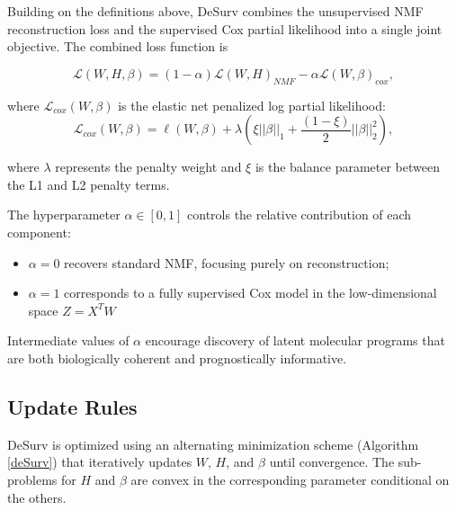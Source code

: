 \documentclass[9pt,twocolumn,twoside,]{pnas-new}
\begin{document}
Building on the definitions above, DeSurv combines the unsupervised NMF
reconstruction loss and the supervised Cox partial likelihood into a
single joint objective. The combined loss function is

\begin{equation}\label{loss}
    \mathcal{L}(W,H,\beta) = (1-\alpha) \mathcal{L}(W,H)_{NMF} - \alpha \mathcal{L}(W,\beta)_{cox},
\end{equation}

where \(\mathcal{L}_{cox}(W,\beta)\) is the elastic net penalized log
partial likelihood: \begin{equation}\label{pen_loglik}
  \mathcal{L}_{cox}(W,\beta) = \ell(W,\beta) + \lambda(\xi||\beta||_1 + \frac{(1-\xi)}{2} ||\beta||^2_2),
\end{equation}

where \(\lambda\) represents the penalty weight and \(\xi\) is the
balance parameter between the L1 and L2 penalty terms.

The hyperparameter \(\alpha \in [0,1]\) controls the relative
contribution of each component:

\begin{itemize}
\item $\alpha=0$ recovers standard NMF, focusing purely on reconstruction;
\item $\alpha=1$ corresponds to a fully supervised Cox model in the low-dimensional space $Z=X^TW$
\end{itemize}

Intermediate values of \(\alpha\) encourage discovery of latent
molecular programs that are both biologically coherent and
prognostically informative.

\subsection*{Update Rules}\label{update-rules}

DeSurv is optimized using an alternating minimization scheme (Algorithm
\ref{deSurv}) that iteratively updates \(W\), \(H\), and \(\beta\) until
convergence. The sub-problems for \(H\) and \(\beta\) are convex in the
corresponding parameter conditional on the others.
\end{document}

